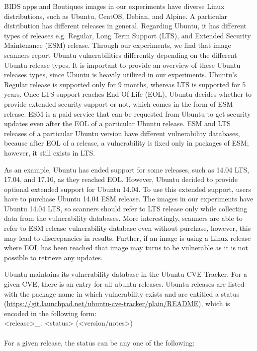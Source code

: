 \documentclass[a4paper,num-refs]{oup-contemporary}
\begin{document}
BIDS apps and Boutiques images in our experiments have diverse Linux
distributions, such as Ubuntu, CentOS, Debian, and Alpine. A particular
distribution has different releases in general. Regarding Ubuntu, it has different
types of releases e.g. Regular, Long Term Support (LTS), and Extended Security Maintenance (ESM) release.
Through our experiments, we find that image scanners report Ubuntu vulnerabilities 
differently depending on the different Ubuntu release types. It is 
important to provide an overview of these Ubuntu releases types, 
since Ubuntu is heavily utilized in our experiments. 
Ubuntu's Regular release is supported only for 9 months, whereas LTS is supported for 5 years. Once LTS support
reaches End-Of-Life (EOL), Ubuntu decides whether to provide extended security support or not, which comes
in the form of ESM release.
ESM is a paid service that can be requested from Ubuntu to get security 
updates even after the EOL of a particular Ubuntu release. ESM and LTS releases of a particular Ubuntu version have different vulnerability
databases, because after EOL of a release, a vulnerability is fixed only in packages of ESM; however, it still
exists in LTS.

As an example, Ubuntu has ended support for some releases, such as 14.04 LTS,
17.04, and 17.10, as they reached EOL. However, Ubuntu decided to provide optional extended support for Ubuntu 14.04.
To use this extended support, users have to purchase Ubuntu 14.04 ESM release.
The images in our experiments have Ubuntu 14.04 LTS, so scanners should refer
to LTS release only while collecting data from the vulnerability databases.
More interestingly, scanners are able to refer to ESM release vulnerability database
even without purchase, however, this may lead to discrepancies in results.
Further, if an image is using a Linux release where EOL has been reached that image may
turns to be vulnerable as it is not possible to retrieve any updates.

Ubuntu maintains its vulnerability database in the Ubuntu CVE Tracker. For a given CVE, there is an entry for all ubuntu releases.
Ubuntu releases are listed with the package name
in which vulnerability exists and are entitled a status
(\url{https://git.launchpad.net/ubuntu-cve-tracker/plain/README}), which is
encoded in the following form:
\newline \\
\noindent <release>\_<source-package>: <status> (<version/notes>) \\
\newline\\
For a given release, the status can be any one of the following:
\end{document}
